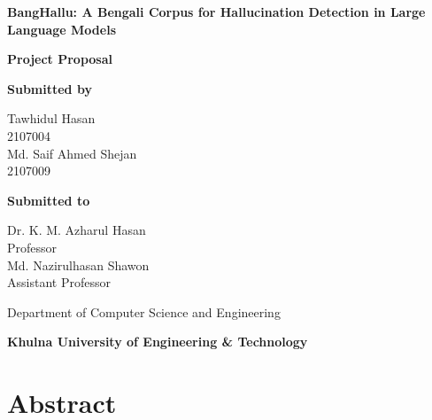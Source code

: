 \documentclass[12pt,a4paper]{article}
\begin{document}
\begin{titlepage}
\centering
\vspace*{1.2cm}

{\LARGE\bfseries BangHallu: A Bengali Corpus for Hallucination Detection in Large Language Models\par}

\vspace{1.6cm}
{\large\bfseries Project Proposal\par}

\vspace{2.0cm}

{\large\bfseries Submitted by\par}
\vspace{0.4cm}
{\large
Tawhidul Hasan\\
2107004\\[0.35cm]
Md. Saif Ahmed Shejan\\
2107009\par}

\vspace{1.6cm}

{\large\bfseries Submitted to\par}
\vspace{0.4cm}
{\large
Dr. K. M. Azharul Hasan\\
Professor\\[0.35cm]
Md. Nazirulhasan Shawon\\
Assistant Professor\par}

\vspace{2.0cm}

{\large Department of Computer Science and Engineering\par}
{\large\bfseries Khulna University of Engineering \& Technology\par}

\vfill
\end{titlepage}

\newpage
\tableofcontents
\newpage

\section{Abstract}
\end{document}
